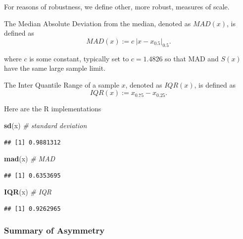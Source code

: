 \documentclass[]{book}
\newenvironment{Shaded}{\begin{snugshade}}{\end{snugshade}}
\newcommand{\KeywordTok}[1]{\textcolor[rgb]{0.13,0.29,0.53}{\textbf{#1}}}
\newcommand{\CommentTok}[1]{\textcolor[rgb]{0.56,0.35,0.01}{\textit{#1}}}
\newcommand{\NormalTok}[1]{#1}
\theoremstyle{definition}
\theoremstyle{definition}
\theoremstyle{definition}
\theoremstyle{remark}
\let\BeginKnitrBlock\begin \let\EndKnitrBlock\end
\begin{document}
For reasons of robustness, we define other, more robust, measures of
scale.

\BeginKnitrBlock{definition}[MAD]
\protect\hypertarget{def:unnamed-chunk-121}{}{\label{def:unnamed-chunk-121}
{} }The Median Absolute Deviation from the median,
denoted as \(MAD(x)\), is defined as
\[MAD(x):= c \: |x-x_{0.5}|_{0.5} . \]
\EndKnitrBlock{definition}

where \(c\) is some constant, typically set to \(c=1.4826\) so that MAD
and \(S(x)\) have the same large sample limit.

\BeginKnitrBlock{definition}[IQR]
\protect\hypertarget{def:unnamed-chunk-122}{}{\label{def:unnamed-chunk-122}
{} }The Inter Quantile Range of a sample \(x\),
denoted as \(IQR(x)\), is defined as \[ IQR(x):= x_{0.75}-x_{0.25} .\]
\EndKnitrBlock{definition}

Here are the R implementations

\begin{Shaded}
\begin{Highlighting}[]
\KeywordTok{sd}\NormalTok{(x) }\CommentTok{# standard deviation}
\end{Highlighting}
\end{Shaded}

\begin{verbatim}
## [1] 0.9881312
\end{verbatim}

\begin{Shaded}
\begin{Highlighting}[]
\KeywordTok{mad}\NormalTok{(x) }\CommentTok{# MAD}
\end{Highlighting}
\end{Shaded}

\begin{verbatim}
## [1] 0.6353695
\end{verbatim}

\begin{Shaded}
\begin{Highlighting}[]
\KeywordTok{IQR}\NormalTok{(x) }\CommentTok{# IQR}
\end{Highlighting}
\end{Shaded}

\begin{verbatim}
## [1] 0.9262965
\end{verbatim}

\subsubsection{Summary of Asymmetry}\label{summary-of-asymmetry}
\end{document}
